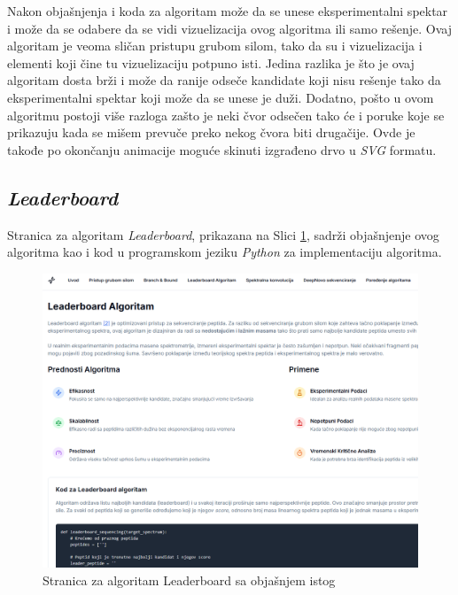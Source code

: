 \documentclass[12pt,oneside]{memoir}
\begin{document}
Nakon objašnjenja i koda za algoritam može da se unese eksperimentalni spektar i može da se odabere da se vidi vizuelizacija ovog algoritma ili samo rešenje. Ovaj algoritam je veoma sličan pristupu grubom silom, tako da su i vizuelizacija i elementi koji čine tu vizuelizaciju potpuno isti. Jedina razlika je što je ovaj algoritam dosta brži i može da ranije odseče kandidate koji nisu rešenje tako da eksperimentalni spektar koji može da se unese je duži. Dodatno, pošto u ovom algoritmu postoji više razloga zašto je neki čvor odsečen tako će i poruke koje se prikazuju kada se mišem prevuče preko nekog čvora biti drugačije. Ovde je takođe po okončanju animacije moguće skinuti izgrađeno drvo u \emph{SVG} formatu.

\subsection{\emph{Leaderboard}}
Stranica za algoritam \emph{Leaderboard}, prikazana na Slici \ref{fig:leaderboard_1}, sadrži objašnjenje ovog algoritma kao i kod u programskom jeziku \emph{Python} za implementaciju algoritma.
\begin{figure}[H]
\centering
\includegraphics[width=1\textwidth]{images/leaderboard_1.png}
\caption{Stranica za algoritam Leaderboard sa objašnjem istog}
\label{fig:leaderboard_1}
\end{figure}
\end{document}
